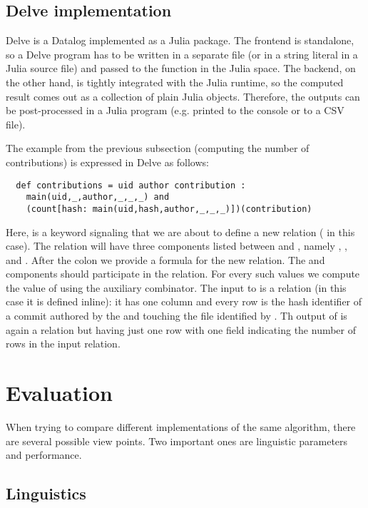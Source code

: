 \subsection{Delve implementation}

Delve is a Datalog implemented as a Julia package. The frontend is standalone,
so a Delve program has to be written in a separate file (or in a string literal in a Julia
source file) and passed to the  function in the Julia space.
The backend, on the other hand, is tightly integrated with the Julia runtime, so
the computed result comes out as a collection of plain Julia objects. Therefore,
the outputs can be post-processed in a Julia program
(e.g. printed to the console or to a CSV file).

The example from the previous subsection (computing the number of contributions)
is expressed in Delve as follows:
\begin{verbatim}
  def contributions = uid author contribution :
    main(uid,_,author,_,_,_) and
    (count[hash: main(uid,hash,author,_,_,_)])(contribution)
\end{verbatim}
Here,  is a keyword signaling that we are about to define a new relation
( in this case). The relation will have three components
listed between \m{=} and \m{:}, namely , , and .
After the colon we provide a formula for the new relation. The  and
 components should participate in the  relation. For every
such values we compute the value of  using the auxiliary
 combinator. The input to  is a relation (in this case it is
defined inline): it has one column  and every row is the hash
identifier of a commit authored by the  and touching the file
identified by . Th output of  is again a relation but having just one row
with one field indicating the number of rows in the input relation.

\section{Evaluation}

When trying to compare different implementations of the same algorithm, there
are several possible view points. Two important ones are linguistic parameters
and performance.

\subsection{Linguistics}

